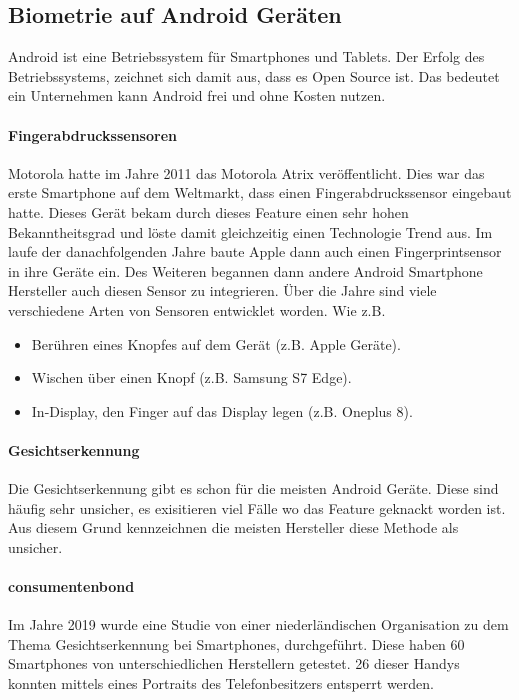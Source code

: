 \subsection{Biometrie auf Android Geräten}
Android ist eine Betriebssystem für Smartphones und Tablets. Der Erfolg des Betriebssystems, zeichnet sich damit aus, dass es Open Source ist. Das bedeutet ein Unternehmen kann Android frei und ohne Kosten nutzen.
\paragraph{Fingerabdruckssensoren}
Motorola hatte im Jahre 2011 das Motorola Atrix veröffentlicht. Dies war das erste Smartphone auf dem Weltmarkt, dass einen Fingerabdruckssensor eingebaut hatte.
Dieses Gerät bekam durch dieses Feature einen sehr hohen Bekanntheitsgrad und löste damit gleichzeitig einen Technologie Trend aus.
Im laufe der danachfolgenden Jahre baute Apple dann auch einen Fingerprintsensor in ihre Geräte ein. Des Weiteren begannen dann andere Android Smartphone Hersteller auch diesen Sensor zu integrieren.
Über die Jahre sind viele verschiedene Arten von Sensoren entwicklet worden. Wie z.B.
\begin{itemize}
	\item Berühren eines Knopfes auf dem Gerät (z.B. Apple Geräte).
	\item Wischen über einen Knopf (z.B. Samsung S7 Edge).
	\item In-Display, den Finger auf das Display legen (z.B. Oneplus 8). 
\end{itemize}
\paragraph{Gesichtserkennung}
Die Gesichtserkennung gibt es schon für die meisten Android Geräte. Diese sind häufig sehr unsicher, es exisitieren viel Fälle wo das Feature geknackt worden ist. Aus diesem Grund kennzeichnen die meisten Hersteller diese Methode als unsicher. 
\\
\paragraph{consumentenbond}
Im Jahre 2019 wurde eine Studie von einer niederländischen Organisation zu dem Thema Gesichtserkennung bei Smartphones, durchgeführt. 
Diese haben 60 Smartphones von unterschiedlichen Herstellern getestet. 26 dieser Handys konnten mittels eines Portraits des Telefonbesitzers entsperrt werden.

